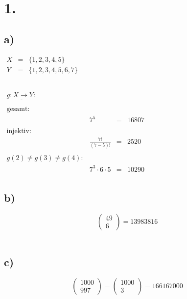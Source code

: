 \documentclass[a4paper]{scrartcl}
\title{\titleinfo}
\author{Arne Struck 6326505}
\date{\today}
\begin{document}
\maketitle
\notag
\section{1.}
	\subsection{a)}
		\(
		\begin{array}{rcl}
			X&=&\{1,2,3,4,5\} \\
			Y&=&\{1,2,3,4,5,6,7\} \\ \\
		\end{array}
		\)
		\\ \\
		\(
		\begin{array}{lrcl}
		\underline{g:X\rightarrow Y:}& \\ \\
		\text{gesamt:} & \\
		&7^5&=&16807 \\ \\
		\text{injektiv:} & \\ 
		&\frac{7!}{(7-5)!}&=&2520 \\ \\
		g(2)\neq g(3)\neq g(4): & \\ 
		&7^3\cdot 6\cdot 5 &=&10290 \\
		\end{array}
		\)
		
	\subsection{b)}
		\[
		\begin{pmatrix}
			49 \\
			6
		\end{pmatrix}
		=13983816 \] \\

	\subsection{c)}
		\[
		\begin{pmatrix}
			1000 \\
			997
		\end{pmatrix}=
		\begin{pmatrix}
			1000 \\
			3
		\end{pmatrix}
		=166167000
		\]
\end{document}
